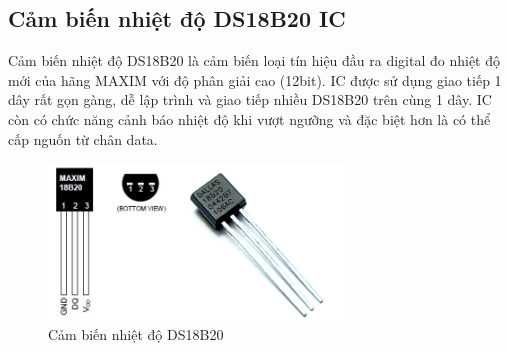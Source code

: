 \subsection{Cảm biến nhiệt độ DS18B20 IC} 
Cảm biến nhiệt độ DS18B20 là cảm biến loại tín hiệu đầu ra digital đo nhiệt độ mới của hãng MAXIM với độ phân giải cao (12bit). IC được sử dụng giao tiếp 1 dây rất gọn gàng, dễ lập trình và giao tiếp nhiều DS18B20 trên cùng 1 dây. IC còn có chức năng cảnh báo nhiệt độ khi vượt ngưỡng và đặc biệt hơn là có thể cấp nguốn từ chân data.

\begin{figure}[H]
	\centering    
	\includegraphics[width=0.7\textwidth]{ds18b20}
	\caption[Cảm biến nhiệt độ DS18B20]{Cảm biến nhiệt độ DS18B20}
	\label{fig:ds18b20}
\end{figure}


